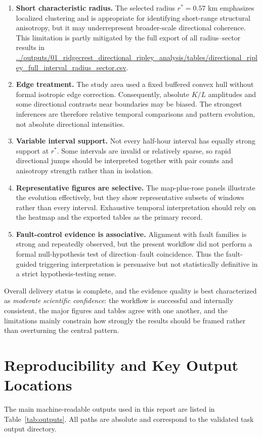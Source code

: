 \documentclass[11pt]{article}
\begin{document}
\begin{enumerate}[leftmargin=2em]
    \item \textbf{Short characteristic radius.} The selected radius $r^{\ast}=0.57$ km emphasizes localized clustering and is appropriate for identifying short-range structural anisotropy, but it may underrepresent broader-scale directional coherence. This limitation is partly mitigated by the full export of all radius--sector results in \url{../outputs/01_ridgecrest_directional_ripley_analysis/tables/directional_ripley_full_interval_radius_sector.csv}.
    \item \textbf{Edge treatment.} The study area used a fixed buffered convex hull without formal isotropic edge correction. Consequently, absolute $K/L$ amplitudes and some directional contrasts near boundaries may be biased. The strongest inferences are therefore relative temporal comparisons and pattern evolution, not absolute directional intensities.
    \item \textbf{Variable interval support.} Not every half-hour interval has equally strong support at $r^{\ast}$. Some intervals are invalid or relatively sparse, so rapid directional jumps should be interpreted together with pair counts and anisotropy strength rather than in isolation.
    \item \textbf{Representative figures are selective.} The map-plus-rose panels illustrate the evolution effectively, but they show representative subsets of windows rather than every interval. Exhaustive temporal interpretation should rely on the heatmap and the exported tables as the primary record.
    \item \textbf{Fault-control evidence is associative.} Alignment with fault families is strong and repeatedly observed, but the present workflow did not perform a formal null-hypothesis test of direction--fault coincidence. Thus the fault-guided triggering interpretation is persuasive but not statistically definitive in a strict hypothesis-testing sense.
\end{enumerate}

Overall delivery status is complete, and the evidence quality is best characterized as \emph{moderate scientific confidence}: the workflow is successful and internally consistent, the major figures and tables agree with one another, and the limitations mainly constrain how strongly the results should be framed rather than overturning the central pattern.

\section{Reproducibility and Key Output Locations}
The main machine-readable outputs used in this report are listed in Table~\ref{tab:outputs}. All paths are absolute and correspond to the validated task output directory.
\end{document}
